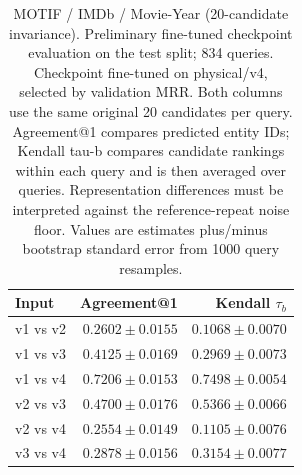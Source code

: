 \begin{table}[t]
\centering
\small
\begin{tabular}{lrr}
\toprule
Input & Agreement@1 & Kendall $\tau_b$ \\
\midrule
v1 vs v2 & $0.2602 \pm 0.0155$ & $0.1068 \pm 0.0070$ \\
v1 vs v3 & $0.4125 \pm 0.0169$ & $0.2969 \pm 0.0073$ \\
v1 vs v4 & $0.7206 \pm 0.0153$ & $0.7498 \pm 0.0054$ \\
v2 vs v3 & $0.4700 \pm 0.0176$ & $0.5366 \pm 0.0066$ \\
v2 vs v4 & $0.2554 \pm 0.0149$ & $0.1105 \pm 0.0076$ \\
v3 vs v4 & $0.2878 \pm 0.0156$ & $0.3154 \pm 0.0077$ \\
\bottomrule
\end{tabular}
\caption{MOTIF / IMDb / Movie-Year (20-candidate invariance). Preliminary fine-tuned checkpoint evaluation on the test split; 834 queries. Checkpoint fine-tuned on physical/v4, selected by validation MRR. Both columns use the same original 20 candidates per query. Agreement@1 compares predicted entity IDs; Kendall tau-b compares candidate rankings within each query and is then averaged over queries. Representation differences must be interpreted against the reference-repeat noise floor. Values are estimates plus/minus bootstrap standard error from 1000 query resamples.}
\label{tab:motif-movie_year-invariance}
\end{table}
